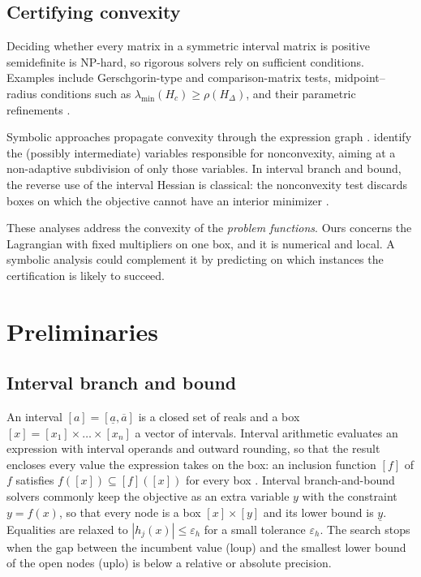 \documentclass[11pt]{article}
\begin{document}
\subsection{Certifying convexity}

Deciding whether every matrix in a symmetric interval matrix is positive semidefinite
is NP-hard, so rigorous solvers rely on sufficient conditions. Examples include
Gerschgorin-type and comparison-matrix tests, midpoint--radius conditions such as
$\lambda_{\min}(H_c) \ge \rho(H_\Delta)$, and their parametric refinements
\citep{Hladik2018}.

Symbolic approaches propagate convexity through the expression graph
\citep{Fourer2010}. \citet{Kearfott2013} identify the (possibly intermediate)
variables responsible for nonconvexity, aiming at a non-adaptive subdivision of only
those variables. In interval branch and bound, the reverse use of the interval Hessian
is classical: the nonconvexity test discards boxes on which the objective cannot have
an interior minimizer \citep{HansenWalster2004}.

These analyses address the convexity of the \emph{problem functions}. Ours concerns the
Lagrangian with fixed multipliers on one box, and it is numerical and local. A symbolic
analysis could complement it by predicting on which instances the certification is
likely to succeed.


\section{Preliminaries}\label{sec:prelim}

\subsection{Interval branch and bound}

An interval $[a] = [\underline a, \overline a]$ is a closed set of reals and a box
$[x] = [x_1] \times \dots \times [x_n]$ a vector of intervals. Interval arithmetic
evaluates an expression with interval operands and outward rounding, so that the
result encloses every value the expression takes on the box: an inclusion function
$[f]$ of $f$ satisfies $f([x]) \subseteq [f]([x])$ for every box
\citep{HansenWalster2004,Neumaier2004}. Interval branch-and-bound solvers commonly keep
the objective as an extra variable $y$ with the constraint $y = f(x)$, so that every
node is a box $[x] \times [y]$ and its lower bound is $\underline{y}$. Equalities are
relaxed to $|h_j(x)| \le \varepsilon_h$ for a small tolerance $\varepsilon_h$. The
search stops when the gap between the incumbent value (loup) and the smallest lower
bound of the open nodes (uplo) is below a relative or absolute precision.
\end{document}
